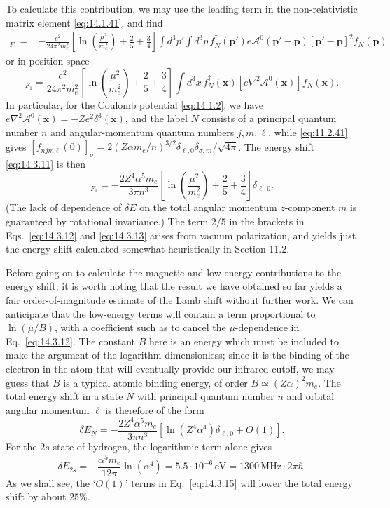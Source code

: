 To calculate this contribution, we may use the leading term in the
non-relativistic matrix element \eqref{eq:14.1.41}, and find
\begin{align}
[\delta E_N]_{F_1}={}&-\frac{e^2}{24\pi^2m_e^2}
\left[\ln\left(\frac{\mu^2}{m_e^2}\right)+\frac25+\frac34\right]
\int d^3p'\int d^3p\,f_N^\dagger(\mathbf p')
e\mathcal A^0(\mathbf p'-\mathbf p)
[\mathbf p'-\mathbf p]^2f_N(\mathbf p)
\tag{14.3.12}\label{eq:14.3.12}
\end{align}
or in position space
\begin{equation}
[\delta E_N]_{F_1}=\frac{e^2}{24\pi^2m_e^2}
\left[\ln\left(\frac{\mu^2}{m_e^2}\right)+\frac25+\frac34\right]
\int d^3x\,f_N^\dagger(\mathbf x)
[e\nabla^2\mathcal A^0(\mathbf x)]f_N(\mathbf x).
\tag{14.3.13}\label{eq:14.3.13}
\end{equation}
In particular, for the Coulomb potential \eqref{eq:14.1.2}, we have
$e\nabla^2\mathcal A^0(\mathbf x)=-Ze^2\delta^3(\mathbf x)$, and the label
$N$ consists of a principal quantum number $n$ and angular-momentum quantum
numbers $j,m,\ell$, while \eqref{eq:11.2.41} gives
$[f_{njm\ell}(0)]_\sigma=2(Z\alpha m_e/n)^{3/2}
\delta_{\ell,0}\delta_{\sigma,m}/\sqrt{4\pi}$. The energy shift
\eqref{eq:14.3.11} is then
\begin{equation}
[\delta E_{nj\ell}]_{F_1}=-\frac{2Z^4\alpha^5m_e}{3\pi n^3}
\left[\ln\left(\frac{\mu^2}{m_e^2}\right)+\frac25+\frac34\right]
\delta_{\ell,0}.
\tag{14.3.14}\label{eq:14.3.14}
\end{equation}
(The lack of dependence of $\delta E$ on the total angular momentum
$z$-component $m$ is guaranteed by rotational invariance.) The term $2/5$ in
the brackets in Eqs.~\eqref{eq:14.3.12} and \eqref{eq:14.3.13} arises from
vacuum polarization, and yields just the energy shift calculated somewhat
heuristically in Section 11.2.

Before going on to calculate the magnetic and low-energy contributions to the
energy shift, it is worth noting that the result we have obtained so far
yields a fair order-of-magnitude estimate of the Lamb shift without further
work. We can anticipate that the low-energy terms will contain a term
proportional to $\ln(\mu/B)$, with a coefficient such as to cancel the
$\mu$-dependence in Eq.~\eqref{eq:14.3.12}. The constant $B$ here is an energy
which must be included to make the argument of the logarithm dimensionless;
since it is the binding of the electron in the atom that will eventually
provide our infrared cutoff, we may guess that $B$ is a typical atomic binding
energy, of order $B\simeq(Z\alpha)^2m_e$. The total energy shift in a state
$N$ with principal quantum number $n$ and orbital angular momentum $\ell$ is
therefore of the form
\begin{equation}
\delta E_N=-\frac{2Z^4\alpha^5m_e}{3\pi n^3}
\left[\ln(Z^4\alpha^4)\delta_{\ell,0}+O(1)\right].
\tag{14.3.15}\label{eq:14.3.15}
\end{equation}
For the $2s$ state of hydrogen, the logarithmic term alone gives
\[
\delta E_{2s}=-\frac{\alpha^5m_e}{12\pi}\ln(\alpha^4)
=5.5\cdot10^{-6}\,\mathrm{eV}=1300\,\mathrm{MHz}\cdot2\pi\hbar.
\]
As we shall see, the `$O(1)$' terms in Eq.~\eqref{eq:14.3.15} will lower the
total energy shift by about $25\%$.

